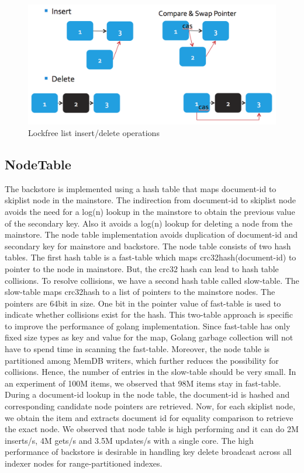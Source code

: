 \documentclass{vldb}
\begin{document}
 \begin{figure}[h]
\includegraphics[scale=0.28]{images/fig-3}
\caption{Lockfree list insert/delete operations}
\label{fig:lockfree-list}
\end{figure}

\subsection{NodeTable}
The backstore is implemented using a hash table that maps document-id to skiplist node in the mainstore. The indirection from document-id to skiplist node avoids the need for a log(n) lookup in the mainstore to obtain the previous value of the secondary key. Also it avoids a log(n) lookup for deleting a node from the mainstore. The node table implementation avoids duplication of document-id and secondary key for mainstore and backstore.
    The node table consists of two hash tables. The first hash table is a fast-table which maps crc32hash(document-id) to pointer to the node in mainstore. But, the crc32 hash can lead to hash table collisions. To resolve collisions, we have a second hash table called slow-table. The slow-table maps crc32hash to a list of pointers to the mainstore nodes. The pointers are 64bit in size. One bit in the pointer value of fast-table is used to indicate whether collisions exist for the hash. This two-table approach is specific to improve the performance of golang implementation. Since fast-table has only fixed size types as key and value for the map, Golang garbage collection will not have to spend time in scanning the fast-table. Moreover, the node table is partitioned among MemDB writers, which further reduces the possibility for collisions. Hence, the number of entries in the slow-table should be very small. In an experiment of 100M items, we observed that 98M items stay in fast-table.
    During a document-id lookup in the node table, the document-id is hashed and corresponding candidate node pointers are retrieved. Now, for each skiplist node, we obtain the item and extracts document id for equality comparison to retrieve the exact node. We observed that node table is high performing and it can do 2M inserts/s, 4M gets/s and 3.5M updates/s with a single core.
    The high performance of backstore is desirable in handling key delete broadcast across all indexer nodes for range-partitioned indexes. 
\end{document}
